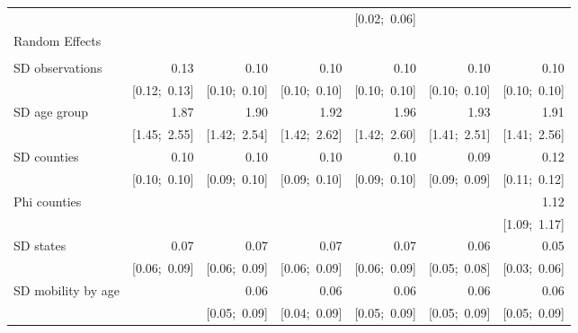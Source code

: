 \begin{sidewaystable}[htp]
\begin{center}
{\begin{tabular}{l D{.}{.}{6.11} D{.}{.}{6.11} D{.}{.}{6.11} D{.}{.}{6.11} D{.}{.}{6.11} D{.}{.}{6.11} }
                               &                 &                 &                 & [0.02;\ 0.06]   &                 &                 \\
Random Effects                 &                 &                 &                 &                 &                 &                 \\
                               &                 &                 &                 &                 &                 &                 \\
\quad SD observations          & 0.13            & 0.10            & 0.10            & 0.10            & 0.10            & 0.10            \\
                               & [0.12;\ 0.13]   & [0.10;\ 0.10]   & [0.10;\ 0.10]   & [0.10;\ 0.10]   & [0.10;\ 0.10]   & [0.10;\ 0.10]   \\
\quad SD age group             & 1.87            & 1.90            & 1.92            & 1.96            & 1.93            & 1.91            \\
                               & [1.45;\ 2.55]   & [1.42;\ 2.54]   & [1.42;\ 2.62]   & [1.42;\ 2.60]   & [1.41;\ 2.51]   & [1.41;\ 2.56]   \\
\quad SD counties              & 0.10            & 0.10            & 0.10            & 0.10            & 0.09            & 0.12            \\
                               & [0.10;\ 0.10]   & [0.09;\ 0.10]   & [0.09;\ 0.10]   & [0.09;\ 0.10]   & [0.09;\ 0.09]   & [0.11;\ 0.12]   \\
\quad Phi counties             &                 &                 &                 &                 &                 & 1.12            \\
                               &                 &                 &                 &                 &                 & [1.09;\ 1.17]   \\
\quad SD states                & 0.07            & 0.07            & 0.07            & 0.07            & 0.06            & 0.05            \\
                               & [0.06;\ 0.09]   & [0.06;\ 0.09]   & [0.06;\ 0.09]   & [0.06;\ 0.09]   & [0.05;\ 0.08]   & [0.03;\ 0.06]   \\
\quad SD mobility by age       &                 & 0.06            & 0.06            & 0.06            & 0.06            & 0.06            \\
                               &                 & [0.05;\ 0.09]   & [0.04;\ 0.09]   & [0.05;\ 0.09]   & [0.05;\ 0.09]   & [0.05;\ 0.09]   \\

\end{tabular}}
\end{center}
\end{sidewaystable}
